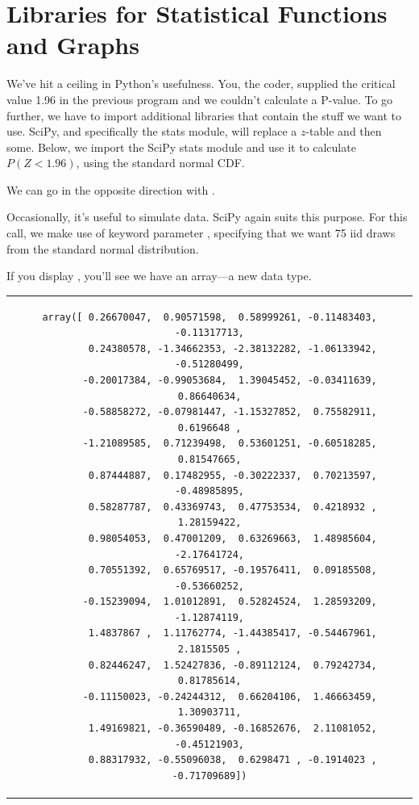 \documentclass{article}
\begin{document}

\section{Libraries for Statistical Functions and Graphs}
We've hit a ceiling in Python's usefulness. You, the coder, supplied the critical value 1.96 in the previous program and we couldn't calculate a P-value. To go further, we have to import additional libraries that contain the stuff we want to use. SciPy, and specifically the stats module, will replace a $z$-table and then some. Below, we import the SciPy stats module and use it to calculate $P(Z < 1.96)$, using the standard normal CDF.


\noindent We can go in the opposite direction with . 


Occasionally, it's useful to simulate data. SciPy again suits this purpose. For this call, we make use of keyword parameter , specifying that we want 75 iid draws from the standard normal distribution. 


\noindent If you display , you'll see we have an array---a new data type.

\begin{center}
\begin{tabular}{c}
\begin{lstlisting}[backgroundcolor=\color{white}, numbers = none]
    array([ 0.26670047,  0.90571598,  0.58999261, -0.11483403, -0.11317713,
        0.24380578, -1.34662353, -2.38132282, -1.06133942, -0.51280499,
       -0.20017384, -0.99053684,  1.39045452, -0.03411639,  0.86640634,
       -0.58858272, -0.07981447, -1.15327852,  0.75582911,  0.6196648 ,
       -1.21089585,  0.71239498,  0.53601251, -0.60518285,  0.81547665,
        0.87444887,  0.17482955, -0.30222337,  0.70213597, -0.48985895,
        0.58287787,  0.43369743,  0.47753534,  0.4218932 ,  1.28159422,
        0.98054053,  0.47001209,  0.63269663,  1.48985604, -2.17641724,
        0.70551392,  0.65769517, -0.19576411,  0.09185508, -0.53660252,
       -0.15239094,  1.01012891,  0.52824524,  1.28593209, -1.12874119,
        1.4837867 ,  1.11762774, -1.44385417, -0.54467961,  2.1815505 ,
        0.82446247,  1.52427836, -0.89112124,  0.79242734,  0.81785614,
       -0.11150023, -0.24244312,  0.66204106,  1.46663459,  1.30903711,
        1.49169821, -0.36590489, -0.16852676,  2.11081052, -0.45121903,
        0.88317932, -0.55096038,  0.6298471 , -0.1914023 , -0.71709689])
\end{lstlisting}
\end{tabular}
\end{center}
\end{document}
